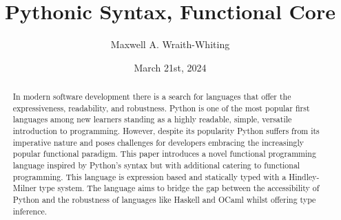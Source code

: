 \documentclass{l4proj}
\begin{document}
\title{Pythonic Syntax, Functional Core}
\author{Maxwell A. Wraith-Whiting}
\date{March 21st, 2024}

\maketitle

\begin{abstract}





    In modern software development there is a search for languages that offer the expressiveness, readability, and robustness.
    Python is one of the most popular first languages among new learners standing as a highly readable, simple, versatile introduction to programming.
    However, despite its popularity Python suffers from its imperative nature and poses challenges for developers embracing the increasingly popular functional paradigm.
    This paper introduces a novel functional programming language inspired by Python’s syntax but with additional catering to functional programming.
    This language is expression based and statically typed with a Hindley-Milner type system.
    The language aims to bridge the gap between the accessibility of Python and the robustness of languages like Haskell and OCaml whilst offering type inference.


\end{abstract}
\end{document}
